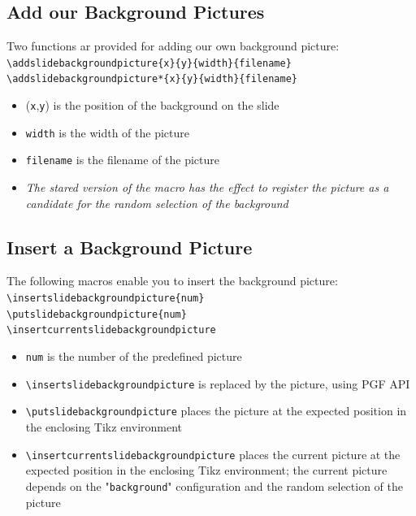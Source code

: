 \documentclass[english,sectioncirclenumberstyle]{ciadbeamer}
\begin{document}
\subsection{Add our Background Pictures}

\begin{frame}{\subsecname}
	Two functions ar provided for adding our own background picture: \\[.25cm]
	\texttt{{\textbackslash}addslidebackgroundpicture\{x\}\{y\}\{width\}\{filename\}} \\[.25cm]
	\texttt{{\textbackslash}addslidebackgroundpicture*\{x\}\{y\}\{width\}\{filename\}} \\[.25cm]
	\begin{itemize}
		\item (\texttt{x},\texttt{y}) is the position of the background on the slide
		\item \texttt{width} is the width of the picture
		\item \texttt{filename} is the filename of the picture
		\item \emph{The stared version of the macro has the effect to register the picture as a candidate for the random selection of the background}
	\end{itemize}
\end{frame}

\subsection{Insert a Background Picture}

\begin{frame}{\subsecname}
	The following macros enable you to insert the background picture: \\[.25cm]
	\texttt{{\textbackslash}insertslidebackgroundpicture\{num\}} \\[.25cm]
	\texttt{{\textbackslash}putslidebackgroundpicture\{num\}} \\[.25cm]
	\texttt{{\textbackslash}insertcurrentslidebackgroundpicture} \\[.25cm]
	\begin{itemize}
		\item \texttt{num} is the number of the predefined picture
		\item \texttt{{\textbackslash}insertslidebackgroundpicture} is replaced by the picture, using PGF API
		\item \texttt{{\textbackslash}putslidebackgroundpicture} places the picture at the expected position in the enclosing Tikz environment
		\item \texttt{{\textbackslash}insertcurrentslidebackgroundpicture} places the current picture at the expected position in the enclosing Tikz environment; the current picture depends on the "\texttt{background}" configuration and the random selection of the picture
	\end{itemize}
\end{frame}
\end{document}
